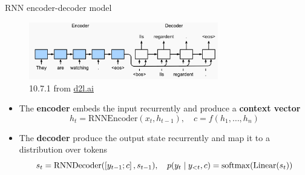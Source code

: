 \documentclass[usenames,dvipsnames,notes,11pt,aspectratio=169,hyperref={colorlinks=true, linkcolor=blue}]{beamer}
\begin{document}
\begin{frame}
    {RNN encoder-decoder model}
    \begin{figure}
        \includegraphics[height=2.5cm]{figures/rnn-enc-dec}
        \caption{10.7.1 from \href{https://d2l.ai/chapter_recurrent-modern/seq2seq.html}{d2l.ai}}
    \end{figure}
    \vspace{-1em}

    \begin{itemize}
        \item The \textbf{encoder} embeds the input recurrently
            and produce a \textbf{context vector}
            $$
            h_t = \mathrm{RNNEncoder}(x_t, h_{t-1}), \quad
            c = f(h_1,\ldots,h_n)
            $$
        \pause
        \item The \textbf{decoder}  produce the output state {recurrently}
            and map it to a distribution over tokens
            $$s_t = \mathrm{RNNDecoder}(\left[ y_{t-1};c \right], s_{t-1}), \quad
            p(y_t\mid y_{<t}, c) = \mathrm{softmax}(\mathrm{Linear}(s_t))
            $$
    \end{itemize}
\end{frame}
\end{document}
